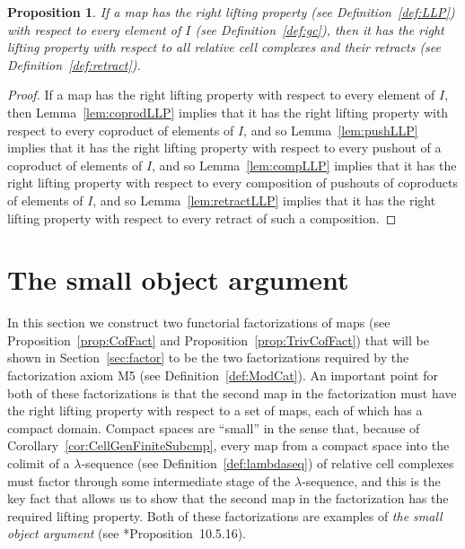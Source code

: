 \documentclass{amsart}
\numberwithin{equation}{section}
\theoremstyle{slplain}
\newtheorem{prop}[equation]{Proposition}
\theoremstyle{definition}
\theoremstyle{remark}
\newcommand{\propref}{Proposition~\ref}
\newcommand{\lemref}{Lemma~\ref}
\newcommand{\defref}{Definition~\ref}
\newcommand{\secref}{Section~\ref}
\begin{document}
\begin{prop}
  \label{prop:ClCmpLift}
  If a map has the right lifting property (see \defref{def:LLP}) with
  respect to every element of $I$ (see \defref{def:gc}), then it has
  the right lifting property with respect to all relative cell
  complexes and their retracts (see \defref{def:retract}).
\end{prop}

\begin{proof}
  If a map has the right lifting property with respect to every
  element of $I$, then \lemref{lem:coprodLLP} implies that it has the
  right lifting property with respect to every coproduct of elements
  of $I$, and so \lemref{lem:pushLLP} implies that it has the right
  lifting property with respect to every pushout of a coproduct of
  elements of $I$, and so \lemref{lem:compLLP} implies that it has the
  right lifting property with respect to every composition of pushouts
  of coproducts of elements of $I$, and so \lemref{lem:retractLLP}
  implies that it has the right lifting property with respect to every
  retract of such a composition.
\end{proof}

\section{The small object argument}
\label{sec:SmObj}

In this section we construct two functorial factorizations of maps
(see \propref{prop:CofFact} and \propref{prop:TrivCofFact}) that will
be shown in \secref{sec:factor} to be the two factorizations required
by the factorization axiom M5 (see \defref{def:ModCat}).  An important
point for both of these factorizations is that the second map in the
factorization must have the right lifting property with respect to a
set of maps, each of which has a compact domain.  Compact spaces are
``small'' in the sense that, because of
Corollary~\ref{cor:CellGenFiniteSubcmp}, every map from a compact
space into the colimit of a $\lambda$-sequence (see
\defref{def:lambdaseq}) of relative cell complexes must factor through
some intermediate stage of the $\lambda$-sequence, and this is the key
fact that allows us to show that the second map in the factorization
has the required lifting property.  Both of these factorizations are
examples of \emph{the small object argument} (see
\cite{MCATL}*{Proposition~10.5.16}).
\end{document}
